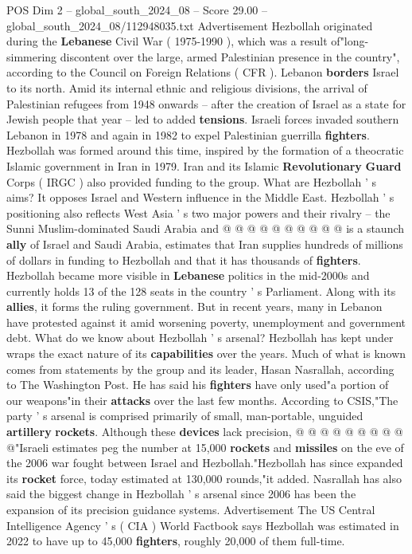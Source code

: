 \begin{textsample}{POS Dim 2 – global\_south\_2024\_08 – Score 29.00 – global\_south\_2024\_08/112948035.txt}
Advertisement Hezbollah originated during the \textbf{Lebanese} Civil War ( 1975-1990 ), which was a result of"long-simmering discontent over the large, armed Palestinian presence in the country", according to the Council on Foreign Relations ( CFR ).
Lebanon \textbf{borders} Israel to its north.
Amid its internal ethnic and religious divisions, the arrival of Palestinian refugees from 1948 onwards -- after the creation of Israel as a state for Jewish people that year -- led to added \textbf{tensions}.
Israeli forces invaded southern Lebanon in 1978 and again in 1982 to expel Palestinian guerrilla \textbf{fighters}.
Hezbollah was formed around this time, inspired by the formation of a theocratic Islamic government in Iran in 1979.
Iran and its Islamic \textbf{Revolutionary} \textbf{Guard} Corps ( IRGC ) also provided funding to the group.
What are Hezbollah ' s aims?
It opposes Israel and Western influence in the Middle East.
Hezbollah ' s positioning also reflects West Asia ' s two major powers and their rivalry -- the Sunni Muslim-dominated Saudi Arabia and @ @ @ @ @ @ @ @ @ @ is a staunch \textbf{ally} of Israel and Saudi Arabia, estimates that Iran supplies hundreds of millions of dollars in funding to Hezbollah and that it has thousands of \textbf{fighters}.
Hezbollah became more visible in \textbf{Lebanese} politics in the mid-2000s and currently holds 13 of the 128 seats in the country ' s Parliament.
Along with its \textbf{allies}, it forms the ruling government.
But in recent years, many in Lebanon have protested against it amid worsening poverty, unemployment and government debt.
What do we know about Hezbollah ' s arsenal?
Hezbollah has kept under wraps the exact nature of its \textbf{capabilities} over the years.
Much of what is known comes from statements by the group and its leader, Hasan Nasrallah, according to The Washington Post.
He has said his \textbf{fighters} have only used"a portion of our weapons"in their \textbf{attacks} over the last few months.
According to CSIS,"The party ' s arsenal is comprised primarily of small, man-portable, unguided \textbf{artillery} \textbf{rockets}.
Although these \textbf{devices} lack precision, @ @ @ @ @ @ @ @ @ @"Israeli estimates peg the number at 15,000 \textbf{rockets} and \textbf{missiles} on the eve of the 2006 war fought between Israel and Hezbollah."Hezbollah has since expanded its \textbf{rocket} force, today estimated at 130,000 rounds,"it added.
Nasrallah has also said the biggest change in Hezbollah ' s arsenal since 2006 has been the expansion of its precision guidance systems.
Advertisement The US Central Intelligence Agency ' s ( CIA ) World Factbook says Hezbollah was estimated in 2022 to have up to 45,000 \textbf{fighters}, roughly 20,000 of them full-time.

\end{textsample}
